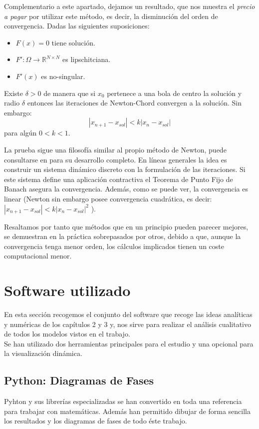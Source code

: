  Complementario a este apartado, dejamos un resultado, que nos muestra el \textit{precio a pagar} por utilizar este método, es decir, la disminución del orden de convergencia. 
 Dadas las siguientes suposiciones:
 \begin{itemize}
 	\item $F(x)=0$ tiene solución.
 	\item $F':\Omega \rightarrow \mathbb{R}^{N\times N}$ es lipschitciana.
 	\item $F'(x)$ es no-singular.
 \end{itemize}
 \begin{theorem}
 	Existe $\delta>0$ de manera que si $x_0$ pertenece a una bola de centro la solución y radio $\delta$ entonces las iteraciones de Newton-Chord convergen a la solución. Sin embargo:
 	\[ |x_{n+1}-x_{sol}|<k|x_n-x_{sol}| \]
 	para algún $0<k<1$.
 \end{theorem}
 La prueba sigue una filosofía similar al propio método de Newton, puede consultarse en \cite{siam1} para su desarrollo completo. En líneas generales la idea es construir un sistema dinámico discreto con la formulación de las iteraciones. Si este sistema define una aplicación contractiva el Teorema de Punto Fijo de Banach asegura la convergencia. 
 Además, como se puede ver, la convergencia es linear (Newton sin embargo posee convergencia cuadrática, es decir: $|x_{n+1}-x_{sol}|<k|x_n-x_{sol}|^2$ ).
 
 Resaltamos por tanto que métodos que en un principio pueden parecer mejores, se demuestran en la práctica sobrepasados por otros, debido a que, aunque la convergencia tenga menor orden, los cálculos implicados tienen un coste computacional menor.  

 \section{Software utilizado}
 En esta sección recogemos el conjunto del software que recoge las ideas analíticas y numéricas de los capítulos 2 y 3 y, nos sirve para realizar el análisis cualitativo de todos los modelos vistos en el trabajo.\\ Se han utilizado dos herramientas principales para el estudio y una opcional para la visualización dinámica.
 
  \subsection{Python: Diagramas de Fases}
  Pyhton y sus librerías especializadas \cite{Python} se han convertido en toda una referencia para trabajar con matemáticas. Además han permitido dibujar de forma sencilla los resultados y los diagramas de fases de todo éste trabajo.
  
